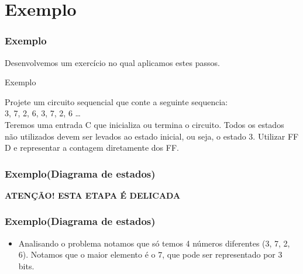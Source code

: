 \documentclass{beamer}
\begin{document}
\section{Exemplo}
\begin{frame}
  \frametitle{Exemplo}
  Desenvolvemos um exercício no qual aplicamos estes passos.\pause
  
   \begin{block}{Exemplo}
    \begin{center}
    Projete um circuito sequencial que conte a seguinte sequencia: \\3, 7, 2, 6, 3, 7, 2, 6 … \\ Teremos uma entrada C que inicializa ou termina o circuito. 
    Todos os estados não utilizados devem ser levados ao estado inicial, ou seja, o estado 3. Utilizar FF D e representar a contagem diretamente dos FF.
    \end{center}
   \end{block}
\end{frame}

\begin{frame}
  \frametitle{Exemplo(Diagrama de estados)}
  \begin{center}
   \textbf{\huge {ATENÇÃO! ESTA ETAPA É DELICADA}}
  \end{center}
\end{frame}

\begin{frame}
  \frametitle{Exemplo(Diagrama de estados)}
  \begin{itemize}
   \item Analisando o problema notamos que só temos 4 números diferentes (3, 7, 2, 6). Notamos que o maior elemento é o 7, que pode ser representado por 3 bits.
  \end{itemize}
\end{frame}
\end{document}
